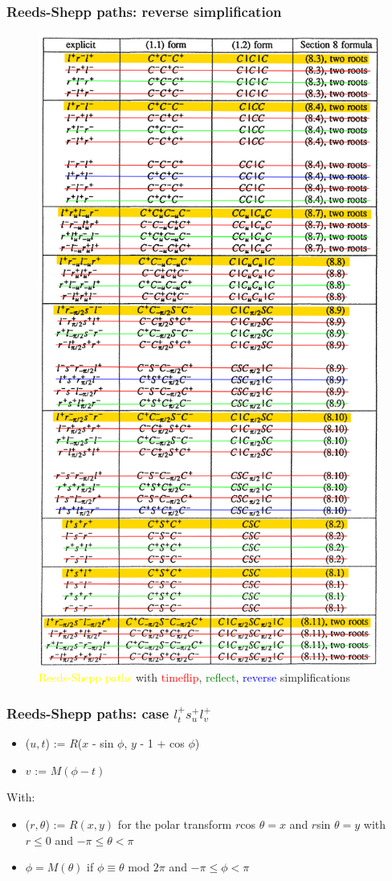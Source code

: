 \documentclass{beamer}
\begin{document}
\begin{frame}

\frametitle{Reeds-Shepp paths: reverse simplification}

\begin{figure}
\centering
  \centering
  \includegraphics[width=0.4\linewidth]{Illustrations/ReedsSheppPossibilitiesNoTitleNoTimeflipNoReflectNoReverse.png}
  \caption{\textcolor{yellow}{Reeds-Shepp paths} with \textcolor{red}{timeflip}, \textcolor{green}{reflect}, \textcolor{blue}{reverse} simplifications}
  \label{fig:sub1}
\end{figure}
\end{frame}


\begin{frame}

\frametitle{Reeds-Shepp paths: case $l_t^+s_u^+l_v^+$}

\begin{itemize}
	\item ($u, t$) := $R$($x$ - sin $\phi$, $y$ - 1 + cos $\phi$)
	\item $v$ := $M(\phi - t)$
\end{itemize}

With:

\begin{itemize}
	\item ($r, \theta$) := $R(x, y)$ for the polar transform $r$cos $\theta = x$ and $r$sin $\theta = y$ with $r \leq 0$ and $-\pi \leq \theta < \pi$
	\item $\phi = M(\theta)$ if $\phi \equiv \theta$ mod $2\pi$ and $-\pi \leq \phi < \pi$
\end{itemize}

\end{frame}
\end{document}
